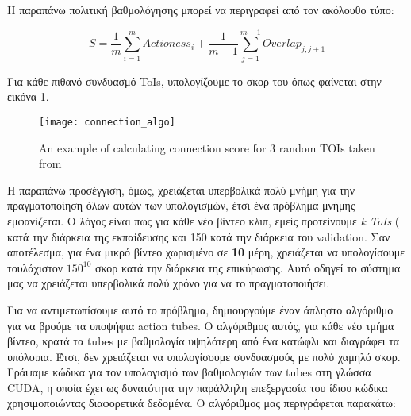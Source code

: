 Η παραπάνω πολιτική βαθμολόγησης μπορεί να περιγραφεί από τον ακόλουθο τύπο:

\[ S = \frac{1}{m} \sum_ {i=1}^{m} Actioness_i + \frac{1}{m-1} \sum_{j=1}^{m-1} Overlap_{j,j+1} \]

Για κάθε πιθανό συνδυασμό \en ToIs\gr, υπολογίζουμε το σκορ του όπως φαίνεται στην εικόνα \ref{fig:gr_connection_algo}.

\begin{figure}[h]
  \centering
  \en
  \texttt{[image: connection\_algo]}
  \caption{An example of calculating connection score for 3 random TOIs taken from \cite{DBLP:journals/corr/HouCS17}}
  \label{fig:gr_connection_algo}
\end{figure}

Η παραπάνω προσέγγιση, όμως, χρειάζεται υπερβολικά πολύ μνήμη για την πραγματοποίηση όλων αυτών των υπολογισμών, έτσι
ένα πρόβλημα μνήμης εμφανίζεται. Ο λόγος είναι πως για κάθε νέο βίντεο κλιπ, εμείς προτείνουμε \en\textit{k ToIs} (
κατά την διάρκεια της εκπαίδευσης και 150 κατά την διάρκεια του \en validation\gr.
Σαν αποτέλεσμα, για ένα μικρό βίντεο χωρισμένο σε \textbf{10 }μέρη, χρειάζεται να υπολογίσουμε τουλάχιστον
\textbf{$150^{10}$} σκορ κατά την διάρκεια της επικύρωσης. Αυτό οδηγεί το σύστημα μας να χρειάζεται υπερβολικά πολύ χρόνο
για να το πραγματοποιήσει.

Για να αντιμετωπίσουμε αυτό το πρόβλημα, δημιουργούμε έναν άπληστο αλγόριθμο για να βρούμε τα υποψήφια \en action tubes\gr.
Ο αλγόριθμος αυτός, για κάθε νέο τμήμα βίντεο, κρατά τα \en tubes \gr με βαθμολογία υψηλότερη από ένα κατώφλι και διαγράφει τα υπόλοιπα.
Έτσι, δεν χρειάζεται να υπολογίσουμε συνδυασμούς με πολύ χαμηλό σκορ. Γράψαμε κώδικα για τον υπολογισμό των βαθμολογιών των \en tubes \gr
στη γλώσσα \en CUDA\gr, η οποία έχει ως δυνατότητα την παράλληλη επεξεργασία του ίδιου κώδικα χρησιμοποιώντας διαφορετικά δεδομένα. Ο αλγόριθμος μας περιγράφεται παρακάτω:

